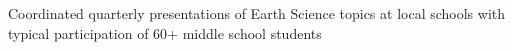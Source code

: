 \documentclass[letterpaper]{deedy-resume} %
\begin{document}
\begin{minipage}[t]{0.66\textwidth}
\sectionspace %

%
%
%
%



\begin{tightitemize}
\item Coordinated quarterly presentations of Earth Science topics at local schools with typical participation of 60+ middle school students
\end{tightitemize}

\end{minipage} %





\end{document}
